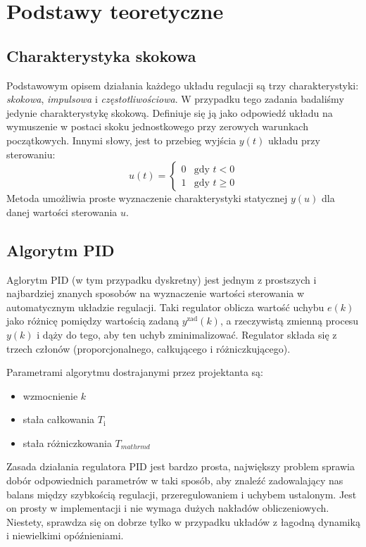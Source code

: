 \chapter{Podstawy teoretyczne}

\section{Charakterystyka skokowa}
Podstawowym opisem działania każdego układu regulacji są trzy charakterystyki: \textit{skokowa}, \textit{impulsowa} i \textit{częstotliwościowa}. W przypadku tego zadania badaliśmy jedynie charakterystykę skokową. Definiuje się ją jako odpowiedź układu na wymuszenie w postaci skoku jednostkowego przy zerowych warunkach początkowych. Innymi słowy, jest to przebieg wyjścia $y(t)$ układu przy sterowaniu:
\begin{equation}
u(t)=
\begin{cases}
0 & \textrm{gdy } t < 0\\
1 & \textrm{gdy } t \ge 0
\end{cases}
\nonumber
\end{equation}
Metoda umożliwia proste wyznaczenie charakterystyki statycznej $y(u)$  dla danej wartości sterowania $u$.

\section{Algorytm PID}
Aglorytm PID (w tym przypadku dyskretny) jest jednym z prostszych i najbardziej znanych sposobów na wyznaczenie wartości sterowania w automatycznym układzie regulacji. Taki regulator oblicza wartość uchybu $e(k)$ jako różnicę pomiędzy wartością zadaną $y^{\mathrm{zad}}(k)$, a rzeczywistą zmienną procesu $y(k)$ i dąży do tego, aby ten uchyb zminimalizować. Regulator składa się z trzech członów (proporcjonalnego, całkującego i różniczkującego). 

Parametrami algorytmu dostrajanymi przez projektanta są:

\begin{itemize}
	\item wzmocnienie $k$
	\item stała całkowania $T_{\mathrm{i}}$
	\item stała różniczkowania $T_{mathrm{d}}$
\end{itemize} 

Zasada działania regulatora PID jest bardzo prosta, największy problem sprawia dobór odpowiednich parametrów w taki sposób, aby znaleźć zadowalający nas balans między szybkością regulacji, przeregulowaniem i uchybem ustalonym. Jest on prosty w implementacji i nie wymaga dużych nakładów obliczeniowych. Niestety, sprawdza się on dobrze tylko w przypadku układów z łagodną dynamiką i niewielkimi opóźnieniami.

